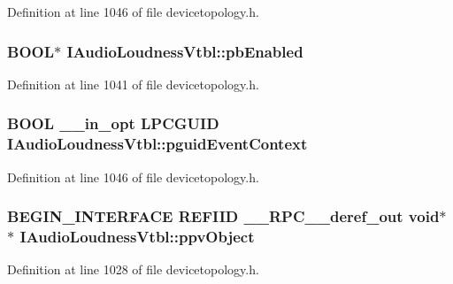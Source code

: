 Definition at line 1046 of file devicetopology.\+h.

\subsubsection[{\texorpdfstring{pb\+Enabled}{pbEnabled}}]{ {\bf B\+O\+OL}$\ast$ I\+Audio\+Loudness\+Vtbl\+::pb\+Enabled}\hypertarget{struct_i_audio_loudness_vtbl_a23b662de1e5b0b68a27dadbb4a21e6ab}{}\label{struct_i_audio_loudness_vtbl_a23b662de1e5b0b68a27dadbb4a21e6ab}


Definition at line 1041 of file devicetopology.\+h.

\subsubsection[{\texorpdfstring{pguid\+Event\+Context}{pguidEventContext}}]{ {\bf B\+O\+OL} {\bf \+\_\+\+\_\+in\+\_\+opt} {\bf L\+P\+C\+G\+U\+ID} I\+Audio\+Loudness\+Vtbl\+::pguid\+Event\+Context}\hypertarget{struct_i_audio_loudness_vtbl_a2e3193d7c8002971151b34062c20a817}{}\label{struct_i_audio_loudness_vtbl_a2e3193d7c8002971151b34062c20a817}


Definition at line 1046 of file devicetopology.\+h.

\subsubsection[{\texorpdfstring{ppv\+Object}{ppvObject}}]{\setlength{\rightskip}{0pt plus 5cm}B\+E\+G\+I\+N\+\_\+\+I\+N\+T\+E\+R\+F\+A\+CE {\bf R\+E\+F\+I\+ID} {\bf \+\_\+\+\_\+\+R\+P\+C\+\_\+\+\_\+deref\+\_\+out} {\bf void}$\ast$$\ast$ I\+Audio\+Loudness\+Vtbl\+::ppv\+Object}\hypertarget{struct_i_audio_loudness_vtbl_a487235473f0bb39a74ec21ab487cd187}{}\label{struct_i_audio_loudness_vtbl_a487235473f0bb39a74ec21ab487cd187}


Definition at line 1028 of file devicetopology.\+h.

